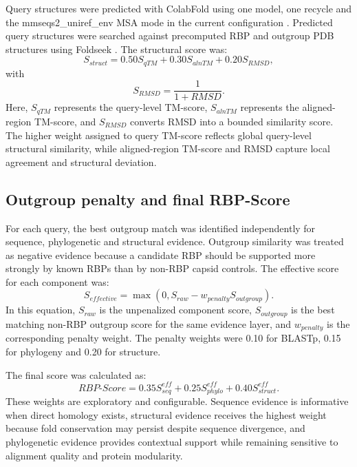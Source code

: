 \documentclass[runningheads]{llncs}
\begin{document}
Query structures were predicted with ColabFold using one model, one recycle and the mmseqs2\_uniref\_env MSA mode in the current configuration \cite{mirdita2022}. Predicted query structures were searched against precomputed RBP and outgroup PDB structures using Foldseek \cite{vankempen2024}. The structural score was:
\begin{equation}
S_{struct}=0.50S_{qTM}+0.30S_{alnTM}+0.20S_{RMSD},
\end{equation}
with
\begin{equation}
S_{RMSD}=\frac{1}{1+RMSD}.
\end{equation}
Here, $S_{qTM}$ represents the query-level TM-score, $S_{alnTM}$ represents the aligned-region TM-score, and $S_{RMSD}$ converts RMSD into a bounded similarity score. The higher weight assigned to query TM-score reflects global query-level structural similarity, while aligned-region TM-score and RMSD capture local agreement and structural deviation.

\subsection{Outgroup penalty and final RBP-Score}

For each query, the best outgroup match was identified independently for sequence, phylogenetic and structural evidence. Outgroup similarity was treated as negative evidence because a candidate RBP should be supported more strongly by known RBPs than by non-RBP capsid controls. The effective score for each component was:
\begin{equation}
S_{effective}=\max(0, S_{raw}-w_{penalty}S_{outgroup}).
\end{equation}
In this equation, $S_{raw}$ is the unpenalized component score, $S_{outgroup}$ is the best matching non-RBP outgroup score for the same evidence layer, and $w_{penalty}$ is the corresponding penalty weight. The penalty weights were 0.10 for BLASTp, 0.15 for phylogeny and 0.20 for structure.

The final score was calculated as:
\begin{equation}
RBP\text{-}Score=0.35S_{seq}^{eff}+0.25S_{phylo}^{eff}+0.40S_{struct}^{eff}.
\end{equation}
These weights are exploratory and configurable. Sequence evidence is informative when direct homology exists, structural evidence receives the highest weight because fold conservation may persist despite sequence divergence, and phylogenetic evidence provides contextual support while remaining sensitive to alignment quality and protein modularity.
\end{document}
